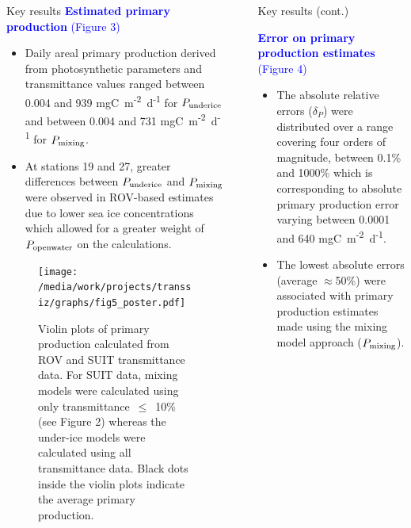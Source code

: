 \documentclass[final]{beamer}
\newlength{\sepwidth}
\newlength{\colwidth}
\newcommand{\separatorcolumn}{\begin{column}{\sepwidth}\end{column}}
\newcommand{\ppopenwater}{\ensuremath{P_{\text{\scriptsize openwater}}}}
\newcommand{\ppmixing}{\ensuremath{P_{\text{\scriptsize mixing}}}}
\newcommand{\ppunderice}{\ensuremath{P_{\text{\scriptsize underice}}}}
\newcommand{\dailypp}{mgC~m\textsuperscript{-2}~d\textsuperscript{-1}}
\begin{document}
\begin{frame}[t]
\begin{columns}[t]
\begin{column}{\colwidth}
\begin{block}{Key results}
				\textcolor{blue}{\large \textbf{Estimated primary production} (Figure 3)}
				\begin{itemize}
					\justifying
					\setlength\itemsep{1.5em}
					\item Daily areal primary production derived from photosynthetic parameters and transmittance values ranged between 0.004 and 939 \dailypp{} for \ppunderice{} and between 0.004 and 731 \dailypp{} for \ppmixing{}.
					\item At stations 19 and 27, greater differences between \ppunderice{} and \ppmixing{} were observed in ROV-based estimates due to lower sea ice concentrations which allowed for a greater weight of \ppopenwater{} on the calculations.
				\end{itemize}

				\begin{figure}
					\centering
					\texttt{[image: /media/work/projects/transsiz/graphs/fig5\_poster.pdf]}
					\caption{Violin plots of primary production calculated from ROV and SUIT transmittance data. For SUIT data, mixing models were calculated using only transmittance~$\le$~10\% (see Figure 2) whereas the under-ice models were calculated using all transmittance data. Black dots inside the violin plots indicate the average primary production.}
				\end{figure}

			\end{block}

		\end{column}

		\separatorcolumn

		\begin{column}{\colwidth}

			\begin{block}{Key results (cont.)}

				\textcolor{blue}{\large \textbf{Error on primary production estimates} (Figure 4)}

				\begin{itemize}
					\justifying
					\setlength\itemsep{1.5em}
					\item The absolute relative errors ($\delta_P$) were distributed over a range covering four orders of magnitude, between 0.1\% and 1000\% which is corresponding to absolute primary production error varying between 0.0001 and 640 \dailypp{}.
					\item The lowest absolute errors (average $\approx$50\%) were associated with primary production estimates made using the mixing model approach (\ppmixing{}).
				\end{itemize}


\end{block}
\end{column}
\end{columns}
\end{frame}
\end{document}
